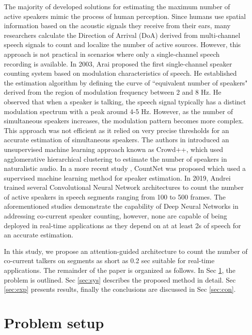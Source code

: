 \documentclass[a4paper]{article}
\begin{document}
The majority of developed solutions for estimating the maximum number of active speakers mimic the process of human perception. Since humans use spatial information based on the acoustic signals they receive from their ears, many researchers calculate the Direction of Arrival (DoA) derived from multi-channel speech signals to count and localize the  
number of active sources. However, this approach is not practical in scenarios where only a single-channel speech recording is available. In 2003, Arai \cite{arai2003estimating} proposed the first single-channel speaker counting system based on modulation characteristics of speech. He established the estimation algorithm by defining the curve of ``equivalent number of speakers" derived from the region of  modulation  frequency between 2 and 8 Hz. He observed that when a speaker is talking, the speech  signal typically has a distinct modulation spectrum with a peak around 4-5 Hz. However, as the number of simultaneous speakers increases, the modulation pattern becomes more complex. This approach was not efficient as it relied on very precise thresholds for an  accurate estimation of simultaneous speakers. 
The authors in \cite{xu2013crowd++} introduced an unsupervised machine learning approach known as Crowd++, which used agglomerative hierarchical clustering to estimate the number of speakers in naturalistic audio. In a more recent study \cite{stoter2018countnet}, CountNet was proposed which used a supervised machine learning method for speaker estimation. In 2019, Andrei \cite{andrei2019overlapped} trained several Convolutional Neural Network architectures to count the number of active speakers in speech segments ranging from 100 to 500 frames. The aforementioned studies demonstrate the capability of Deep Neural Networks in addressing co-current speaker counting, however, none are capable of being deployed in real-time applications as they depend on at at least 2s of speech for an accurate estimation.


In this study, we propose an attention-guided architecture to count the number of co-current talkers on segments as short as  0.2 sec suitable for real-time applications. The remainder of the paper is organized as follows. In Sec \ref{sec:prob}, the problem is outlined. Sec \ref{sec:sys} describes the proposed method in detail. Sec \ref{sec:exp} presents results, finally the conclusions are discussed in Sec \ref{sec:con}. 

\section{Problem setup}
\label{sec:prob}
\end{document}
